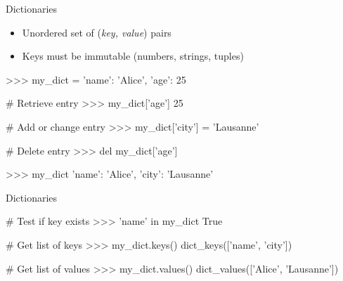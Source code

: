\documentclass[10pt]{beamer}
\begin{document}
\begin{frame}[fragile]{Dictionaries}

    \begin{itemize}
        \item \pause Unordered set of (\emph{key, value}) pairs
        \item \pause Keys must be immutable (numbers, strings, tuples)
    \end{itemize}

    \pause

    \begin{pythoncode}
        >>> my_dict = {'name': 'Alice', 'age': 25}
    \end{pythoncode}

    \pause

    \begin{pythoncode}
        # Retrieve entry
        >>> my_dict['age']
        25
    \end{pythoncode}

    \pause

    \begin{pythoncode}
        # Add or change entry
        >>> my_dict['city'] = 'Lausanne'

        # Delete entry
        >>> del my_dict['age']
    \end{pythoncode}

    \pause

    \begin{pythoncode}
        >>> my_dict
        {'name': 'Alice', 'city': 'Lausanne'}
    \end{pythoncode}

\end{frame}


\begin{frame}[fragile]{Dictionaries}

    \begin{pythoncode}
        # Test if key exists
        >>> 'name' in my_dict
        True
    \end{pythoncode}

    \pause

    \begin{pythoncode}
        # Get list of keys
        >>> my_dict.keys()
        dict_keys(['name', 'city'])
    \end{pythoncode}

    \pause

    \begin{pythoncode}
        # Get list of values
        >>> my_dict.values()
        dict_values(['Alice', 'Lausanne'])
    \end{pythoncode}

\end{frame}
\end{document}
